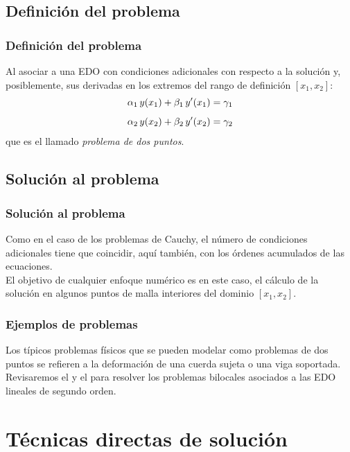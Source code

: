 \subsection{Definición del problema}
\begin{frame}
\frametitle{Definición del problema}
Al asociar a una EDO con condiciones adicionales con respecto a la solución y, posiblemente, sus derivadas en los extremos del rango de definición $[x_{1}, x_{2}]$:
\begin{align}
\alpha_{1} \, y(x_{1}) + \beta_{1} \, {y}^{\prime} (x_{1}) &= \gamma_{1} \label{eq:ecuacion_12_09} \\[0.5em]
\alpha_{2} \, y(x_{2}) + \beta_{2} \, {y}^{\prime} (x_{2}) &= \gamma_{2} \label{eq:ecuacion_12_10}
\end{align}
que es el llamado \emph{problema de dos puntos}.
\end{frame}
\subsection*{Solución al problema}
\begin{frame}
\frametitle{Solución al problema}
Como en el caso de los problemas de Cauchy, el número de condiciones adicionales tiene que coincidir, aquí también, con los órdenes acumulados de las ecuaciones.
\\
\bigskip
El objetivo de cualquier enfoque numérico es en este caso, el cálculo de la solución en algunos puntos de malla interiores del dominio $[x_{1}, x_{2}]$.
\end{frame}
\begin{frame}
\frametitle{Ejemplos de problemas}
Los típicos problemas físicos que se pueden modelar como problemas de dos puntos se refieren a la deformación de una cuerda sujeta o una viga soportada.
\\
\bigskip
Revisaremos el  y el   para resolver los problemas bilocales asociados a las EDO lineales de segundo orden.
\end{frame}
\section{Técnicas directas de solución}
